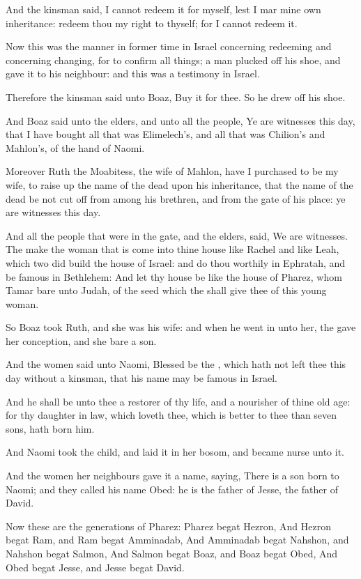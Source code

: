 \Verse And the kinsman said, I cannot redeem it for myself, lest I mar mine own inheritance: redeem thou my right to thyself; for I cannot redeem it.

\Verse Now this was the manner in former time in Israel concerning redeeming and concerning changing, for to confirm all things; a man plucked off his shoe, and gave it to his neighbour: and this was a testimony in Israel.

\Verse Therefore the kinsman said unto Boaz, Buy it for thee. So he drew off his shoe.

\Verse And Boaz said unto the elders, and unto all the people, Ye are witnesses this day, that I have bought all that was Elimelech's, and all that was Chilion's and Mahlon's, of the hand of Naomi.

\Verse Moreover Ruth the Moabitess, the wife of Mahlon, have I purchased to be my wife, to raise up the name of the dead upon his inheritance, that the name of the dead be not cut off from among his brethren, and from the gate of his place: ye are witnesses this day.

\Verse And all the people that were in the gate, and the elders, said, We are witnesses. The \LORD make the woman that is come into thine house like Rachel and like Leah, which two did build the house of Israel: and do thou worthily in Ephratah, and be famous in Bethlehem: \Verse And let thy house be like the house of Pharez, whom Tamar bare unto Judah, of the seed which the \LORD shall give thee of this young woman.

\Verse So Boaz took Ruth, and she was his wife: and when he went in unto her, the \LORD gave her conception, and she bare a son.

\Verse And the women said unto Naomi, Blessed be the \LORD, which hath not left thee this day without a kinsman, that his name may be famous in Israel.

\Verse And he shall be unto thee a restorer of thy life, and a nourisher of thine old age: for thy daughter in law, which loveth thee, which is better to thee than seven sons, hath born him.

\Verse And Naomi took the child, and laid it in her bosom, and became nurse unto it.

\Verse And the women her neighbours gave it a name, saying, There is a son born to Naomi; and they called his name Obed: he is the father of Jesse, the father of David.

\Verse Now these are the generations of Pharez: Pharez begat Hezron, \Verse And Hezron begat Ram, and Ram begat Amminadab, \Verse And Amminadab begat Nahshon, and Nahshon begat Salmon, \Verse And Salmon begat Boaz, and Boaz begat Obed, \Verse And Obed begat Jesse, and Jesse begat David.

